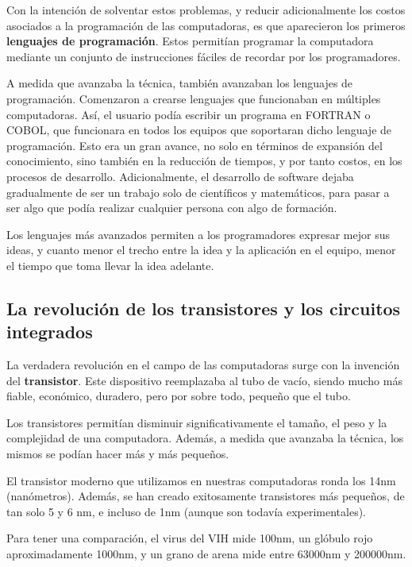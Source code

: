 Con la intención de solventar estos problemas, y reducir adicionalmente los
costos asociados a la programación de las computadoras, es que aparecieron los
primeros \textbf{lenguajes de programación}. Estos permitían programar la
computadora mediante un conjunto de instrucciones fáciles de recordar por los
programadores.\autocite[cap. 3]{ceruzzi_2003}

A medida que avanzaba la técnica, también avanzaban los lenguajes de programación.
Comenzaron a crearse lenguajes que funcionaban en múltiples computadoras. Así,
el usuario podía escribir un programa en FORTRAN o COBOL, que funcionara en todos
los equipos que soportaran dicho lenguaje de programación. Esto era un gran avance,
no solo en términos de expansión del conocimiento, sino también en la reducción
de tiempos, y por tanto costos, en los procesos de desarrollo. Adicionalmente,
el desarrollo de software dejaba gradualmente de ser un trabajo solo de
científicos y matemáticos, para pasar a ser algo que podía realizar cualquier
persona con algo de formación.

Los lenguajes más avanzados permiten a los programadores expresar mejor sus
ideas, y cuanto menor el trecho entre la idea y la aplicación en el equipo,
menor el tiempo que toma llevar la idea adelante.

\subsection{La revolución de los transistores y los circuitos integrados}

La verdadera revolución en el campo de las computadoras surge con la invención
del \textbf{transistor}. Este dispositivo reemplazaba al tubo de vacío, siendo
mucho más fiable, económico, duradero, pero por sobre todo, pequeño que el tubo.

Los transistores permitían disminuir significativamente el tamaño, el peso y
la complejidad de una computadora. Además, a medida que avanzaba la técnica,
los mismos se podían hacer más y más pequeños.

\begin{knowwhat}
El transistor moderno que utilizamos en nuestras computadoras ronda los 14nm
(nanómetros). Además, se han creado exitosamente transistores más pequeños, de
tan solo 5 y 6 nm, e incluso de 1nm (aunque son todavía experimentales).

Para tener una comparación, el virus del VIH mide 100nm, un glóbulo rojo
aproximadamente 1000nm, y un grano de arena mide entre 63000nm y 200000nm.
\end{knowwhat}

